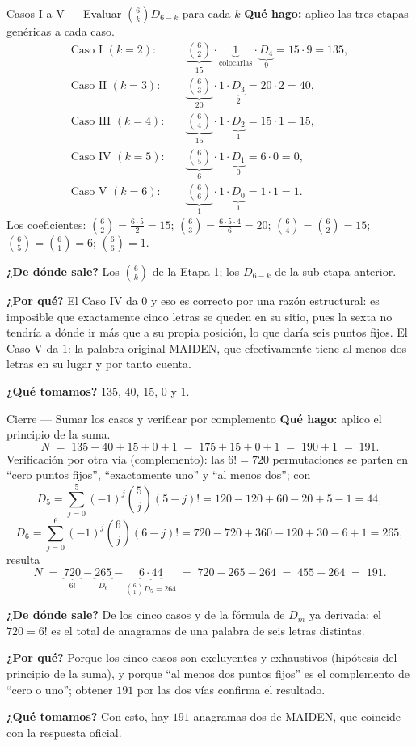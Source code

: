 \documentclass[11pt]{article}
\begin{document}
\begin{paso}{Casos I a V --- Evaluar $\binom{6}{k}D_{6-k}$ para cada $k$}
\textbf{Qu\'e hago:} aplico las tres etapas gen\'ericas a cada caso.
\[
\begin{aligned}
\text{Caso I }(k=2):&\quad \underbrace{\binom{6}{2}}_{15}\cdot\underbrace{1}_{\text{colocarlas}}\cdot\underbrace{D_4}_{9}=15\cdot 9=135,\\
\text{Caso II }(k=3):&\quad \underbrace{\binom{6}{3}}_{20}\cdot 1\cdot\underbrace{D_3}_{2}=20\cdot 2=40,\\
\text{Caso III }(k=4):&\quad \underbrace{\binom{6}{4}}_{15}\cdot 1\cdot\underbrace{D_2}_{1}=15\cdot 1=15,\\
\text{Caso IV }(k=5):&\quad \underbrace{\binom{6}{5}}_{6}\cdot 1\cdot\underbrace{D_1}_{0}=6\cdot 0=0,\\
\text{Caso V }(k=6):&\quad \underbrace{\binom{6}{6}}_{1}\cdot 1\cdot\underbrace{D_0}_{1}=1\cdot 1=1 .
\end{aligned}
\]
Los coeficientes: $\binom{6}{2}=\frac{6\cdot 5}{2}=15$; $\binom{6}{3}=\frac{6\cdot 5\cdot 4}{6}=20$;
$\binom{6}{4}=\binom{6}{2}=15$; $\binom{6}{5}=\binom{6}{1}=6$; $\binom{6}{6}=1$.

\textbf{¿De d\'onde sale?} Los $\binom{6}{k}$ de la Etapa 1; los $D_{6-k}$ de la sub-etapa anterior.

\textbf{¿Por qu\'e?} El Caso IV da $0$ y eso es correcto por una raz\'on estructural: es imposible que
exactamente cinco letras se queden en su sitio, pues la sexta no tendr\'ia a d\'onde ir m\'as que a su propia
posici\'on, lo que dar\'ia seis puntos fijos. El Caso V da $1$: la palabra original MAIDEN, que
efectivamente tiene al menos dos letras en su lugar y por tanto cuenta.

\textbf{¿Qu\'e tomamos?} $135$, $40$, $15$, $0$ y $1$.
\end{paso}

\begin{paso}{Cierre --- Sumar los casos y verificar por complemento}
\textbf{Qu\'e hago:} aplico el principio de la suma.
\[
N\;=\;135+40+15+0+1\;=\;175+15+0+1\;=\;190+1\;=\;191 .
\]
Verificaci\'on por otra v\'ia (complemento): las $6!=720$ permutaciones se parten en ``cero puntos fijos'',
``exactamente uno'' y ``al menos dos''; con
\[
D_5=\sum_{j=0}^{5}(-1)^j\binom{5}{j}(5-j)!=120-120+60-20+5-1=44 ,
\]
\[
D_6=\sum_{j=0}^{6}(-1)^j\binom{6}{j}(6-j)!=720-720+360-120+30-6+1=265 ,
\]
resulta
\[
N\;=\;\underbrace{720}_{6!}-\underbrace{265}_{D_6}-\underbrace{6\cdot 44}_{\binom{6}{1}D_5=264}\;=\;720-265-264\;=\;455-264\;=\;191 .
\]

\textbf{¿De d\'onde sale?} De los cinco casos y de la f\'ormula de $D_m$ ya derivada; el $720=6!$ es el total
de anagramas de una palabra de seis letras distintas.

\textbf{¿Por qu\'e?} Porque los cinco casos son excluyentes y exhaustivos (hip\'otesis del principio de la
suma), y porque ``al menos dos puntos fijos'' es el complemento de ``cero o uno''; obtener $191$ por las dos
v\'ias confirma el resultado.

\textbf{¿Qu\'e tomamos?} Con esto, hay $191$ anagramas-dos de MAIDEN, que coincide con la respuesta oficial.
\end{paso}
\end{document}
